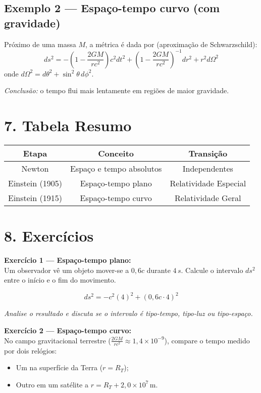 \documentclass[a4paper,12pt]{article}
\begin{document}
\subsection*{Exemplo 2 — Espaço-tempo curvo (com gravidade)}
Próximo de uma massa $M$, a métrica é dada por (aproximação de Schwarzschild):
\[
ds^2 = -\left(1 - \frac{2GM}{rc^2}\right)c^2dt^2 
+ \left(1 - \frac{2GM}{rc^2}\right)^{-1}dr^2 + r^2 d\Omega^2
\]
onde $d\Omega^2 = d\theta^2 + \sin^2\theta\, d\phi^2$.

\textit{Conclusão:} o tempo flui mais lentamente em regiões de maior gravidade.

\section*{7. Tabela Resumo}

\begin{center}
\begin{tabular}{|c|c|c|}
\hline
\textbf{Etapa} & \textbf{Conceito} & \textbf{Transição} \\
\hline
Newton & Espaço e tempo absolutos & Independentes \\
\hline
Einstein (1905) & Espaço-tempo plano & Relatividade Especial \\
\hline
Einstein (1915) & Espaço-tempo curvo & Relatividade Geral \\
\hline
\end{tabular}
\end{center}

\section*{8. Exercícios}

\textbf{Exercício 1 — Espaço-tempo plano:}\\
Um observador vê um objeto mover-se a $0{,}6c$ durante $4\,s$.  
Calcule o intervalo $ds^2$ entre o início e o fim do movimento.

\[
ds^2 = -c^2(4)^2 + (0{,}6c \cdot 4)^2
\]

\textit{Analise o resultado e discuta se o intervalo é tipo-tempo, tipo-luz ou tipo-espaço.}

\vspace{0.4cm}

\textbf{Exercício 2 — Espaço-tempo curvo:}\\
No campo gravitacional terrestre ($\frac{2GM}{rc^2} \approx 1{,}4\times10^{-9}$), compare o tempo medido por dois relógios:
\begin{itemize}
    \item Um na superfície da Terra ($r = R_T$);
    \item Outro em um satélite a $r = R_T + 2{,}0\times10^7 \, \text{m}$.
\end{itemize}
\end{document}
